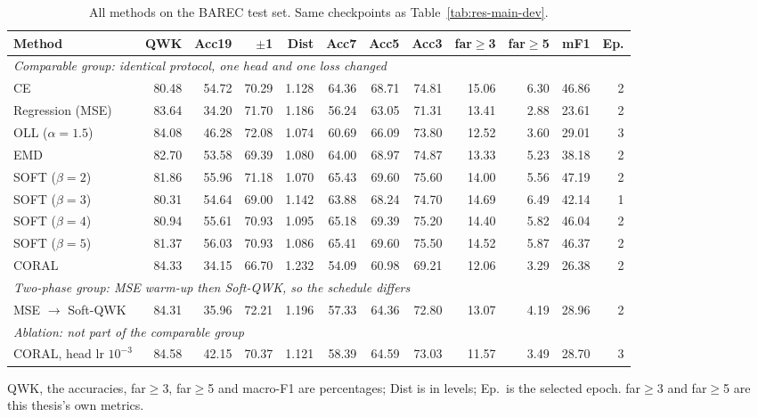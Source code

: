 \begin{table}[H]
\centering
\footnotesize
\caption{All methods on the BAREC test set. Same checkpoints as Table~\ref{tab:res-main-dev}.}
\label{tab:res-main-test}
\begin{adjustbox}{max width=\textwidth}
\begin{tabular}{lrrrrrrrrrrr}
\toprule
\textbf{Method} & \textbf{QWK} & \textbf{Acc19} & \textbf{$\pm$1} & \textbf{Dist} & \textbf{Acc7} & \textbf{Acc5} & \textbf{Acc3} & \textbf{far$\geq$3} & \textbf{far$\geq$5} & \textbf{mF1} & \textbf{Ep.} \\
\midrule
\multicolumn{12}{l}{\textit{Comparable group: identical protocol, one head and one loss changed}} \\
\midrule
CE & 80.48 & 54.72 & 70.29 & 1.128 & 64.36 & 68.71 & 74.81 & 15.06 & 6.30 & 46.86 & 2 \\
Regression (MSE) & 83.64 & 34.20 & 71.70 & 1.186 & 56.24 & 63.05 & 71.31 & 13.41 & 2.88 & 23.61 & 2 \\
OLL ($\alpha=1.5$) & 84.08 & 46.28 & 72.08 & 1.074 & 60.69 & 66.09 & 73.80 & 12.52 & 3.60 & 29.01 & 3 \\
EMD & 82.70 & 53.58 & 69.39 & 1.080 & 64.00 & 68.97 & 74.87 & 13.33 & 5.23 & 38.18 & 2 \\
SOFT ($\beta=2$) & 81.86 & 55.96 & 71.18 & 1.070 & 65.43 & 69.60 & 75.60 & 14.00 & 5.56 & 47.19 & 2 \\
SOFT ($\beta=3$) & 80.31 & 54.64 & 69.00 & 1.142 & 63.88 & 68.24 & 74.70 & 14.69 & 6.49 & 42.14 & 1 \\
SOFT ($\beta=4$) & 80.94 & 55.61 & 70.93 & 1.095 & 65.18 & 69.39 & 75.20 & 14.40 & 5.82 & 46.04 & 2 \\
SOFT ($\beta=5$) & 81.37 & 56.03 & 70.93 & 1.086 & 65.41 & 69.60 & 75.50 & 14.52 & 5.87 & 46.37 & 2 \\
CORAL & 84.33 & 34.15 & 66.70 & 1.232 & 54.09 & 60.98 & 69.21 & 12.06 & 3.29 & 26.38 & 2 \\
\midrule
\multicolumn{12}{l}{\textit{Two-phase group: MSE warm-up then Soft-QWK, so the schedule differs}} \\
\midrule
MSE $\rightarrow$ Soft-QWK & 84.31 & 35.96 & 72.21 & 1.196 & 57.33 & 64.36 & 72.80 & 13.07 & 4.19 & 28.96 & 2 \\
\midrule
\multicolumn{12}{l}{\textit{Ablation: not part of the comparable group}} \\
\midrule
CORAL, head lr $10^{-3}$ & 84.58 & 42.15 & 70.37 & 1.121 & 58.39 & 64.59 & 73.03 & 11.57 & 3.49 & 28.70 & 3 \\
\bottomrule
\end{tabular}
\end{adjustbox}

\vspace{0.1cm}
{\footnotesize QWK, the accuracies, far$\geq$3, far$\geq$5 and macro-F1 are percentages; Dist is in levels; Ep.\ is the selected epoch. far$\geq$3 and far$\geq$5 are this thesis's own metrics.}
\end{table}
